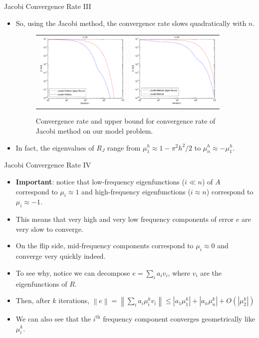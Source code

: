 \documentclass{beamer}
\providecommand{\abs}[1]{\left\lvert #1 \right\rvert}
\providecommand{\norm}[1]{\left\lVert #1 \right\rVert}
\begin{document}
\begin{frame}{Jacobi Convergence Rate III}
 \begin{itemize}
  \item So, using the Jacobi method, the convergence rate slows quadratically
        with $n$.
  \begin{figure}
   \begin{tabular}{cc}
    \includegraphics[width=4.5cm]{images/jacobiConvergence_32.pdf} & \includegraphics[width=4.5cm]{images/jacobiConvergence_64.pdf}
   \end{tabular}
   \caption{Convergence rate and upper bound for convergence rate of Jacobi
            method on our model problem.}
  \end{figure}
  \item In fact, the eigenvalues of $R_J$ range from $\mu_1^h \approx 1-\pi^2h^2/2$
        to $\mu_n^h \approx -\mu_1^h$.
 \end{itemize}
\end{frame}

\begin{frame}{Jacobi Convergence Rate IV}
 \begin{itemize}
  \item \textbf{Important}: notice that low-frequency eigenfunctions ($i\ll n$)
        of $A$ correspond to $\mu_i \approx 1$ and high-frequency eigenfunctions
        ($i \approx n$) correspond to $\mu_i \approx -1$.
  \item This means that very high and very low frequency components of error $e$
        are very slow to converge.
  \item On the flip side, mid-frequency components correspond to
        $\mu_i \approx 0$ and converge very quickly indeed.
  \item To see why, notice we can decompose $e = \sum_i a_i v_i$, where $v_i$
        are the eigenfunctions of $R$.
  \item Then, after $k$ iterations, $\norm{e} = \norm{\sum_i a_i \mu_i^k v_i} \leq \abs{a_1\mu_1^k} + \abs{a_n\mu_n^k} + O(\abs{\mu_2^k})$
  \item We can also see that the $i^\text{th}$ frequency component converges
        geometrically like $\mu_i^k$.
 \end{itemize}
\end{frame}
\end{document}
